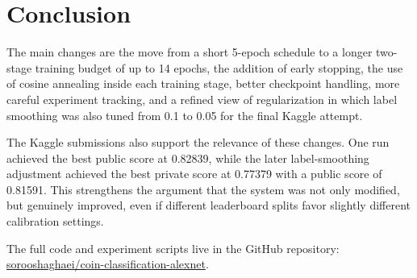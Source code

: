 \documentclass[11pt,a4paper]{article}
\begin{document}
\section{Conclusion}
The main changes are the move from a short 5-epoch schedule to a longer two-stage training budget of up to 14 epochs, the addition of early stopping, the use of cosine annealing inside each training stage, better checkpoint handling, more careful experiment tracking, and a refined view of regularization in which label smoothing was also tuned from 0.1 to 0.05 for the final Kaggle attempt.

The Kaggle submissions also support the relevance of these changes. One run achieved the best public score at 0.82839, while the later label-smoothing adjustment achieved the best private score at 0.77379 with a public score of 0.81591. This strengthens the argument that the system was not only modified, but genuinely improved, even if different leaderboard splits favor slightly different calibration settings.

The full code and experiment scripts live in the GitHub repository: \href{https://github.com/sorooshaghaei/coin-classification-alexnet}{sorooshaghaei/coin-classification-alexnet}.
\end{document}
